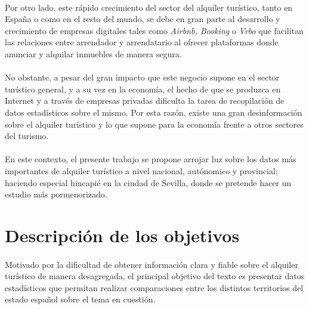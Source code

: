 \documentclass[a4paper,10pt]{article}
\begin{document}
\begin{multicols}{2}
            \paragraph*{}
            Por otro lado, este rápido crecimiento del sector del alquiler turístico, tanto en España o como en el resto del mundo, se debe en gran parte al 
            desarrollo y crecimiento de empresas digitales tales como \textit{Airbnb, Booking} o \textit{Vrbo} que facilitan las relaciones entre
            arrendador y arrendatario al ofrecer plataformas donde anunciar y alquilar inmuebles de manera segura.

            \paragraph*{}
            No obstante, a pesar del gran impacto que este negocio supone en el sector turístico general, y a su vez en la economía, el hecho de que se
            produzca en Internet y a través de empresas privadas dificulta la tarea de recopilación de datos estadísticos sobre el mismo. Por esta razón,
            existe una gran desinformación sobre el alquiler turístico y lo que supone para la economía frente a otros sectores del turismo.

            \paragraph*{}
            En este contexto, el presente trabajo se propone arrojar luz sobre los datos más importantes de alquiler turístico a nivel nacional, autónomico y 
            provincial; haciendo especial hincapié en la ciudad de Sevilla, donde se pretende hacer un estudio más pormenorizado. 

        \section{Descripción de los objetivos}

            \paragraph*{}
            Motivado por la dificultad de obtener información clara y fiable sobre el alquiler turístico de manera desagregada,
            el principal objetivo del texto es presentar datos estadísticos que permitan realizar comparaciones entre los distintos
            territorios del estado español sobre el tema en cuestión.
            

\end{multicols}
\end{document}
